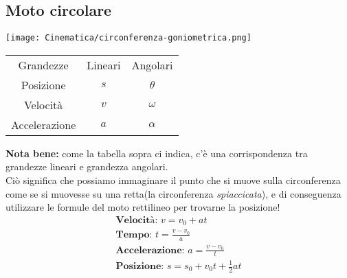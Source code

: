 \subsection{Moto circolare}
\begin{center}
    \texttt{[image: Cinematica/circonferenza-goniometrica.png]}
\end{center}
\begin{center}
    \begin{tabular}{ c c c }
        Grandezze     & Lineari & Angolari \\
        Posizione     & $s$     & $\theta$ \\
        Velocità      & $v$     & $\omega$ \\
        Accelerazione & $a$     & $\alpha$ \\
    \end{tabular}
\end{center}
\textbf{Nota bene: } come la tabella sopra ci indica, c'è una corrispondenza tra grandezze lineari e grandezza angolari. \\ Ciò significa che possiamo immaginare il punto che si muove sulla circonferenza come se si muovesse su una retta(la circonferenza \textit{spiaccicata}), e di conseguenza utilizzare le formule del moto rettilineo per trovarne la posizione!
\begin{gather*}
    \textbf{Velocità: } v = v_0 + a t \\
    \textbf{Tempo: } t = \frac{v - v_0}{a} \\
    \textbf{Accelerazione: } a = \frac{v - v_0}{t} \\
    \textbf{Posizione: } s = s_0 + v_0 t + \frac{1}{2} a t
\end{gather*}

